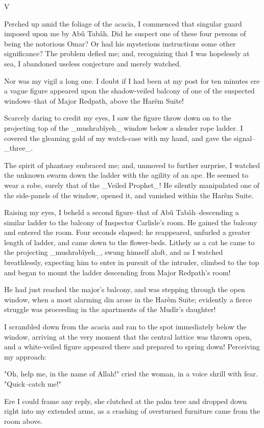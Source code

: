 V

Perched up amid the foliage of the acacia, I commenced that singular
guard imposed upon me by Abû Tabâh. Did he suspect one of these four
persons of being the notorious Omar? Or had his mysterious
instructions some other significance? The problem defied me; and,
recognizing that I was hopelessly at sea, I abandoned useless
conjecture and merely watched.

Nor was my vigil a long one. I doubt if I had been at my post for ten
minutes ere a vague figure appeared upon the shadow-veiled balcony of
one of the suspected windows--that of Major Redpath, above the Harêm
Suite!

Scarcely daring to credit my eyes, I saw the figure throw down on to
the projecting top of the _mushrabîyeh_ window below a slender rope
ladder. I covered the gleaming gold of my watch-case with my hand, and
gave the signal--_three_.

The spirit of phantasy embraced me; and, unmoved to further surprise,
I watched the unknown swarm down the ladder with the agility of an
ape. He seemed to wear a robe, surely that of the _Veiled Prophet_!
He silently manipulated one of the side-panels of the window, opened
it, and vanished within the Harêm Suite.

Raising my eyes, I beheld a second figure--that of Abû
Tabâh--descending a similar ladder to the balcony of Inspector
Carlisle's room. He gained the balcony and entered the room. Four
seconds elapsed; he reappeared, unfurled a greater length of ladder,
and came down to the flower-beds. Lithely as a cat he came to the
projecting _mushrabîyeh_, swung himself aloft, and as I watched
breathlessly, expecting him to enter in pursuit of the intruder,
climbed to the top and began to mount the ladder descending from
Major Redpath's room!

He had just reached the major's balcony, and was stepping through
the open window, when a most alarming din arose in the Harêm Suite;
evidently a fierce struggle was proceeding in the apartments of the
Mudîr's daughter!

I scrambled down from the acacia and ran to the spot immediately below
the window, arriving at the very moment that the central lattice was
thrown open, and a white-veiled figure appeared there and prepared to
spring down! Perceiving my approach:

"Oh, help me, in the name of Allah!" cried the woman, in a voice
shrill with fear. "Quick--catch me!"

Ere I could frame any reply, she clutched at the palm tree and dropped
down right into my extended arms, as a crashing of overturned
furniture came from the room above.

